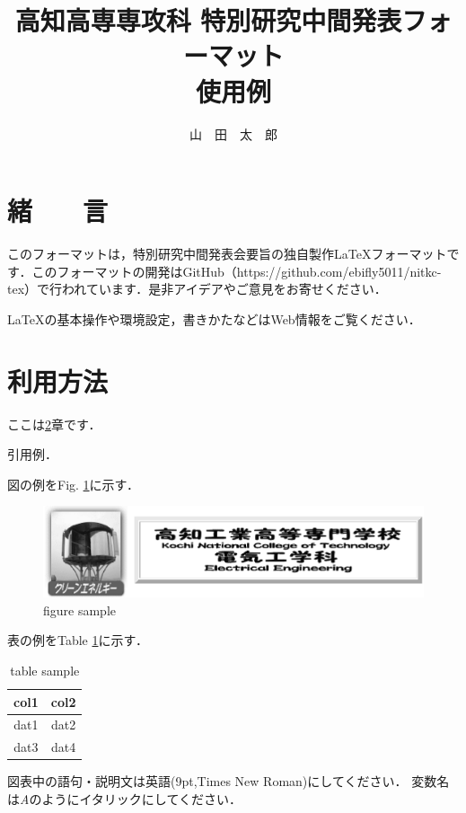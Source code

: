 \documentclass{jsarticle}
\title{高知高専専攻科 特別研究中間発表フォーマット\\使用例}
\author{山　田　太　郎}
\begin{document}
\maketitle


\section{緒　　言}
このフォーマットは，特別研究中間発表会要旨の独自製作{\LaTeX}フォーマットです．このフォーマットの開発はGitHub（https://github.com/ebifly5011/nitkc-tex）で行われています．是非アイデアやご意見をお寄せください．

{\LaTeX}の基本操作や環境設定，書きかたなどはWeb情報をご覧ください．

\section{利用方法}\label{sec:sample}
ここは{\ref{sec:sample}}章です．

引用例．

図の例をFig. \ref{fig:sample}に示す．

\begin{figure}[htbp]
\centering
\includegraphics[width=\columnwidth]{KNCT-EE.eps}
\caption{figure sample}
\label{fig:sample}
\end{figure}

表の例をTable \ref{tab:sample}に示す．

\begin{table}[htbp]
\centering
\caption{table sample}
\label{tab:sample}
\begin{tabular}{c|c}
\hline \hline
col1 & col2 \\
\hline
dat1 & dat2 \\
dat3 & dat4 \\
\hline \hline
\end{tabular}
\end{table}

図表中の語句・説明文は英語(9pt,Times New Roman)にしてください．
変数名は{\itshape A}のようにイタリックにしてください．
\end{document}

